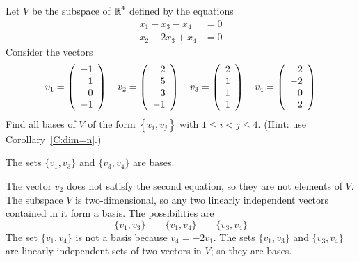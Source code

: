\documentclass{ximera}
\begin{document}
\begin{exercise} \label{A5.6.1}
Let $V$ be the subspace of $\mbox{$\Bbb{R}$}^4$ defined by the equations
\begin{align*}
x_1-x_3-x_4&=0\\
x_2-2x_3+x_4&=0
\end{align*}
Consider the vectors
\[
v_1=\left(\begin{array}{rrrrrrrrrrrrrrrrrr} -1\\1\\0\\-1 \end{array}\right) \quad 
v_2=\left(\begin{array}{rrrrrrrrrrrrrrrrrr} 2\\5\\3\\-1 \end{array}\right) \quad  
v_3=\left(\begin{array}{rrrrrrrrrrrrrrrrrr} 2\\1\\1\\1 \end{array}\right) \quad  
v_4=\left(\begin{array}{rrrrrrrrrrrrrrrrrr} 2\\-2\\0\\2 \end{array}\right)
\]
Find all bases of $V$ of the form $\left\{v_i,v_j\right\}$ with $1\leq i< j\leq 4.$ (Hint: use Corollary~\ref{C:dim=n}.)

\begin{solution}
\ans The sets $\{v_1,v_3\}$ and $\{v_3,v_4\}$ are bases. 

\soln The vector $v_2$ does not satisfy the second equation, so they are not elements of $V$.  
The subspace $V$ is two-dimensional, so any two linearly independent vectors contained in it form a basis. 
The possibilities are 
\[
\{v_1,v_3\} \qquad  \{v_1,v_4\} \qquad \{v_3,v_4\}
\]
The set $\{v_1,v_4\}$ is not a basis because $v_4= -2v_1$. The sets $\{v_1,v_3\}$ and $\{v_3,v_4\}$ are 
linearly independent sets of two vectors in $V$; so they are bases. 
\end{solution}
\end{exercise}
\end{document}
